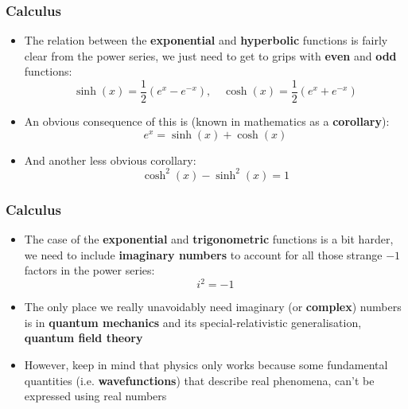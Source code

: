 \documentclass{beamer}
\begin{document}
\begin{frame}
  \frametitle{Calculus}
  \begin{itemize}
    \item<1-> The relation between the \textbf{exponential} and \textbf{hyperbolic} functions is fairly clear from the power series, we just need to get to grips with \textbf{even} and \textbf{odd} functions:
      \begin{equation}
	\sinh(x)=\frac{1}{2}\left( e^x-e^{-x} \right), \quad \cosh(x)=\frac{1}{2}\left( e^x+e^{-x} \right)
	\label{<+label+>}
      \end{equation}
    \item<2-> An obvious consequence of this is (known in mathematics as a \textbf{corollary}):
      \begin{equation*}
	e^x=\sinh(x)+\cosh(x)	
      \end{equation*}
    \item<3-> And another less obvious corollary:
      \begin{equation*}
	\cosh^2(x)-\sinh^2(x)=1
      \end{equation*}
  \end{itemize}
\end{frame}

\begin{frame}
  \frametitle{Calculus}
  \begin{itemize}
    \item<1-> The case of the \textbf{exponential} and \textbf{trigonometric} functions is a bit harder, we need to include \textbf{imaginary numbers} to account for all those strange $-1$ factors in the power series:
      \begin{equation*}
	i^2=-1
      \end{equation*}
    \item<2-> The only place we really unavoidably need imaginary (or \textbf{complex}) numbers is in \textbf{quantum mechanics} and its special-relativistic generalisation, \textbf{quantum field theory}
    \item<3-> However, keep in mind that physics only works because some fundamental quantities (i.e. \textbf{wavefunctions}) that describe real phenomena, can't be expressed using real numbers
  \end{itemize}
\end{frame}
\end{document}
